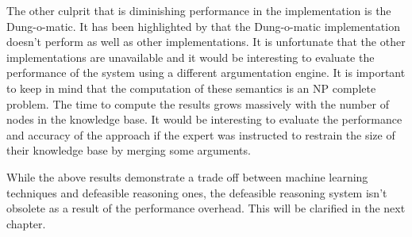 The other culprit that is diminishing performance in the implementation is the Dung-o-matic. It has been highlighted by \cite{cerutti2014generating} that the Dung-o-matic implementation doesn't perform as well as other implementations. It is unfortunate that the other implementations are unavailable and it would be interesting to evaluate the performance of the system using a different argumentation engine. It is important to keep in mind that the computation of these semantics is an NP complete problem. The time to compute the results grows massively with the number of nodes in the knowledge base. It would be interesting to evaluate the performance and accuracy of the approach if the expert was instructed to restrain the size of their knowledge base by merging some arguments.

While the above results demonstrate a trade off between machine learning techniques and defeasible reasoning ones, the defeasible reasoning system isn't obsolete as a result of the performance overhead. This will be clarified in the next chapter.
